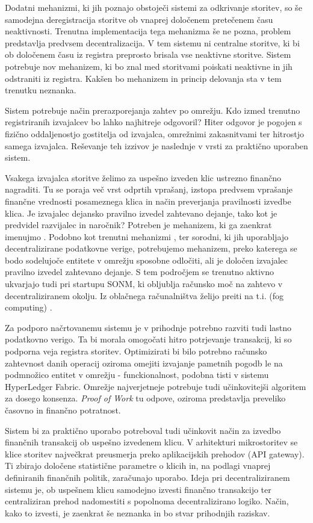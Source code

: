 \documentclass[a4paper, 12pt]{book}
\begin{document}
Dodatni mehanizmi, ki jih poznajo obstoječi sistemi za odkrivanje storitev, so še samodejna deregistracija storitve ob vnaprej določenem pretečenem času neaktivnosti.
Trenutna implementacija tega mehanizma še ne pozna, problem predstavlja predvsem decentralizacija.
V tem sistemu ni centralne storitve, ki bi ob določenem času iz registra preprosto brisala vse neaktivne storitve.
Sistem potrebuje nov mehanizem, ki bo znal med storitvami poiskati neaktivne in jih odstraniti iz registra.
Kakšen bo mehanizem in princip delovanja sta v tem trenutku neznanka.

Sistem potrebuje način prerazporejanja zahtev po omrežju.
Kdo izmed trenutno registriranih izvajalcev bo lahko najhitreje odgovoril?
Hiter odgovor je pogojen s fizično oddaljenostjo gostitelja od izvajalca, omrežnimi zakasnitvami ter hitrostjo samega izvajalca. Reševanje teh izzivov je naslednje v vrsti za praktično uporaben sistem.


Vsakega izvajalca storitve želimo za uspešno izveden klic ustrezno finančno nagraditi. Tu se poraja več vrst odprtih vprašanj, izstopa predvsem vprašanje finančne vrednosti posameznega klica in način preverjanja pravilnosti izvedbe klica.
Je izvajalec dejansko pravilno izvedel zahtevano dejanje, tako kot je predvidel razvijalec in naročnik?
Potreben je mehanizem, ki ga zaenkrat imenujmo .
Podobno kot trenutni mehanizmi ,  ter sorodni, ki jih uporabljajo decentralizirane podatkovne verige, potrebujemo mehanizem, preko katerega se bodo sodelujoče entitete v omrežju sposobne odločiti, ali je določen izvajalec pravilno izvedel zahtevano dejanje.
S tem področjem se trenutno aktivno ukvarjajo tudi pri startupu SONM, ki obljublja računsko moč na zahtevo v decentraliziranem okolju. Iz oblačnega računalništva želijo preiti na t.i.  (fog computing) \cite{Sonm}.

Za podporo načrtovanemu sistemu je v prihodnje potrebno razviti tudi lastno podatkovno verigo.
Ta bi morala omogočati hitro potrjevanje transakcij, ki so podporna veja registra storitev.
Optimizirati bi bilo potrebno računsko zahtevnost danih operacij oziroma omejiti izvajanje pametnih pogodb le na podmnožico entitet v omrežju - funckionalnost, podobna tisti v sistemu HyperLedger Fabric.
Omrežje najverjetneje potrebuje tudi učinkovitejši algoritem za dosego konsenza.
\textit{Proof of Work} tu odpove, oziroma predstavlja preveliko časovno in finančno potratnost.

Sistem bi za praktično uporabo potreboval tudi učinkovit način za izvedbo finančnih transakcij ob uspešno izvedenem klicu.
V arhitekturi mikrostoritev se klice storitev največkrat preusmerja preko aplikacijskih prehodov (API gateway).
Ti zbirajo določene statistične parametre o klicih in, na podlagi vnaprej definiranih finančnih politik, zaračunajo uporabo.
Ideja pri decentraliziranem sistemu je, ob uspešnem klicu samodejno izvesti finančno transakcijo ter centraliziran prehod nadomestiti s popolnoma decentralizirano logiko.
Način, kako to izvesti, je zaenkrat še neznanka in bo stvar prihodnjih raziskav.
\end{document}
